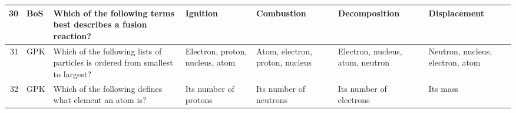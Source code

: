\documentclass[10pt]{article}
\begin{document}
\begin{tiny}
\begin{longtable}{r|p{0.375in}|p{1.275in}|p{0.75in}|p{0.75in}|p{0.75in}|p{0.75in}}
    30    &     BoS &                                                                                                                                                                                                                   Which of the following terms best describes a fusion reaction? &                                                                                                                              Ignition &                                                                                            Combustion &                                                                                                              Decomposition &                                                                                                                      Displacement \\\hline
    31    &      GPK &                                                                                                                                                                                                   Which of the following lists of particles is ordered from smallest to largest? &                                                                                                       Electron, proton, nucleus, atom &                                                                       Atom, electron, proton, nucleus &                                                                                           Electron, nucleus, atom, neutron &                                                                                                  Neutron, nucleus, electron, atom \\\hline
    32    &      GPK &                                                                                                                                                                                                                          Which of the following defines what element an atom is? &                                                                                                                 Its number of protons &                                                                                Its number of neutrons &                                                                                                    Its number of electrons &                                                                                                                          Its mass \\\hline

\end{longtable}
\end{tiny}
\end{document}
